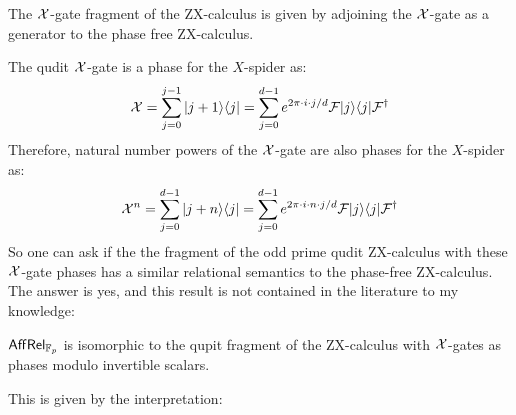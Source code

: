 \begin{example}
\hfil{}
\end{example}


\begin{definition}
The $\cal X$-gate fragment of the ZX-calculus is given by adjoining the $\cal X$-gate as a generator to the phase free ZX-calculus.
\end{definition}
The qudit $\cal X$-gate is a phase for the 
$X$-spider as:
$$
{\cal X} =
 \sum_{j=0}^{j-1} | j+1\rangle \langle j|
=
 \sum_{j=0}^{d-1} e^{2 \pi\cdot i\cdot j/d} {\mathcal F} | j \rangle \langle j|  {\mathcal F}^\dag
$$
Therefore, natural number powers of the ${\cal X}$-gate are also phases for the $X$-spider as:
$$
{\cal X}^n
= 
 \sum_{j=0}^{d-1} | j+n\rangle \langle j|
=
\sum_{j=0}^{d-1} e^{2 \pi\cdot i\cdot n\cdot j/d} {\mathcal F}| j \rangle \langle j|  {\mathcal F}^\dag
$$
So one can ask if the the fragment of the odd prime qudit ZX-calculus with these $\cal X$-gate phases has a similar relational semantics to the phase-free ZX-calculus.  The answer is yes, and this result is not contained in the literature to my knowledge:
\begin{lemma}
$\mathsf{Aff}\mathsf{Rel}_{\mathbb{F}_p}$ is isomorphic to the qupit fragment of the ZX-calculus with $\cal X$-gates as phases modulo invertible scalars.
\end{lemma}
This is given by the interpretation:

